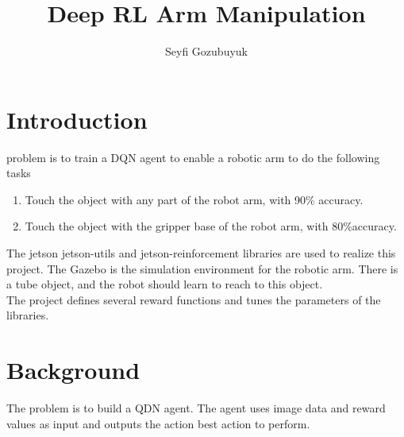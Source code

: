 \documentclass[10pt,journal,compsoc]{IEEEtran}
\begin{document}
\title{Deep RL Arm Manipulation}

\author{Seyfi Gozubuyuk}

%
{}


\maketitle
\IEEEdisplaynontitleabstractindextext
\IEEEpeerreviewmaketitle
\section{Introduction}
\label{sec:introduction}

 problem is to train a DQN agent to enable a robotic arm to do the following tasks
\begin{enumerate}
  \item Touch the object with any part of the robot arm, with 90\% accuracy.
  \item Touch the object with the gripper base of the robot arm, with 80\%accuracy.
\end{enumerate}

The jetson jetson-utils and jetson-reinforcement libraries are used to realize this project\cite{git:jtsnrl}. The Gazebo is the simulation environment for the robotic arm. There is a tube object, and the robot should learn to reach to this object.\\
The project defines several reward functions and tunes the parameters of the libraries.

\section{Background}
The problem is to build a QDN agent. The agent uses image data and reward values as input and outputs the action best action to perform.
\end{document}
